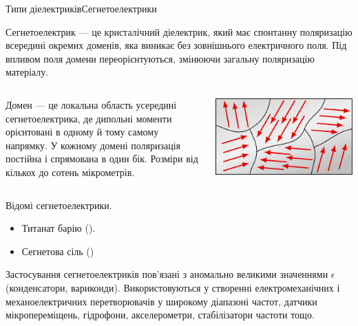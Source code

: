 \documentclass[]{beamer}
\begin{document}
\begin{frame}{Типи діелектриків}{Сегнетоелектрики}
	\begin{block}{}\justifying
		\alert{Сегнетоелектрик} --- це кристалічний діелектрик, який має \alert{спонтанну поляризацію
			всередині окремих доменів}, яка виникає без зовнішнього електричного поля. Під впливом поля
		домени переорієнтуються, змінюючи загальну поляризацію матеріалу.
	\end{block}

	\begin{columns}
		\begin{column}{0.7\linewidth}
			\begin{block}{}\justifying\small
				\alert{Домен} --- це локальна область усередині сегнетоелектрика, де дипольні моменти
				орієнтовані в одному й тому самому напрямку. У кожному домені поляризація постійна і спрямована
				в один бік. Розміри від кількох до сотень мікрометрів.
			\end{block}
		\end{column}
		\begin{column}{0.3\linewidth}\centering
			\includegraphics[width=1\linewidth]{domains}
		\end{column}
	\end{columns}


	\begin{block}{}\scriptsize\justifying
		Відомі сегнетоелектрики.
		\begin{itemize}
			\item Титанат барію ().
			\item Сегнетова сіль ()
		\end{itemize}
		Застосування сегнетоелектриків пов'язані з аномально великими значеннями $\epsilon$
		(конденсатори, вариконди). Використовуються у створенні електромеханічних і механоелектричних
		перетворювачів у широкому діапазоні частот, датчики мікропереміщень, гідрофони, акселерометри,
		стабілізатори частоти тощо.
	\end{block}



\end{frame}
\end{document}
